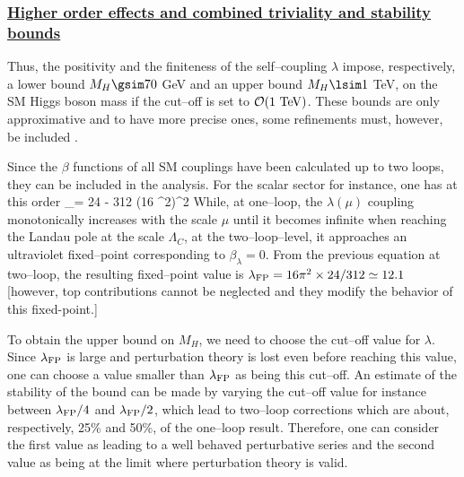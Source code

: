 \subsubsection*{\underline{Higher order effects and combined triviality 
and stability bounds}}

Thus, the positivity and the finiteness of the self--coupling $\lambda$
impose, respectively,  a lower bound $M_H  \gsim 70$ GeV and an upper bound 
$M_H \lsim 1$ TeV, on the SM Higgs boson mass if the cut--off is set to 
${\cal O}(1~{\rm TeV})$. These bounds are only approximative and to have more 
precise ones, some refinements must, however,  be included 
\cite{VACUUMbounds-PR,VACUUMbounds,Riesselman}.\s

Since the $\beta$ functions of all SM couplings have been calculated up to
two loops, they can be included in the analysis. For the scalar sector 
for instance, one has at this order
\beq
{} \equiv 
\beta_\lambda = 24  - 312 
{(16 \pi^2)^2} 
\eeq
While, at one--loop, the $\lambda (\mu)$ coupling monotonically increases with 
the scale $\mu$ until it becomes infinite when reaching the Landau pole at the 
scale $\Lambda_C$, at the two--loop--level, it approaches an ultraviolet
fixed--point corresponding to $\beta_\lambda=0$. From the previous equation at
two--loop, the resulting fixed--point value is $\lambda_{\rm FP} = 16 \pi^2 
\times 24 /  312 \simeq 12.1$  [however, top contributions cannot be neglected
and they modify the behavior of this fixed-point.] \s

To obtain the upper bound on $M_H$, we need to choose the cut--off value
for $\lambda$. Since $\lambda_{\rm FP}$ is large and perturbation theory is
lost even before reaching this value, one can choose a value smaller than
$\lambda_{\rm FP}$ as being this cut--off. An   estimate of the stability of
the bound can be made by varying the cut--off value for instance between
$\lambda_{\rm FP}/4$ and $\lambda_{\rm FP}/2$, which lead to two--loop
corrections which are about, respectively,  25\% and 50\%, of the one--loop
result. Therefore, one can consider the first value as leading to a well 
behaved perturbative series and the second value as being at the limit 
where perturbation theory is valid.\s

